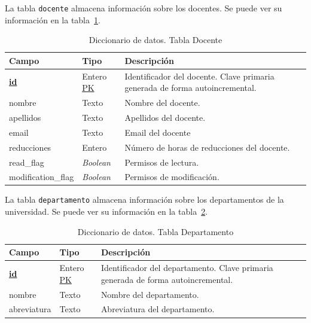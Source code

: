 La tabla \texttt{docente} almacena información sobre los docentes. Se puede ver su información en la tabla~\ref{tab:diccionario_docente}.

\begin{table}
  \centering 
  \begin{tabular}{l p{} p{}}
    \toprule
    \textbf{Campo} & \textbf{Tipo} & \textbf{Descripción}\\
    \midrule
    \textbf{\underline{id}} & Entero \underline{PK} & Identificador del docente. Clave primaria generada de forma autoincremental. \\ \addlinespace
    nombre & Texto & Nombre del docente. \\ \addlinespace
    apellidos & Texto & Apellidos del docente. \\ \addlinespace
    email & Texto & Email del docente \\ \addlinespace
    reducciones & Entero & Número de horas de reducciones del docente. \\ \addlinespace
    read\_flag & \textit{Boolean} & Permisos de lectura. \\ \addlinespace
    modification\_flag & \textit{Boolean} & Permisos de modificación. \\
    \bottomrule
  \end{tabular}
  \caption{Diccionario de datos. Tabla Docente}
  \label{tab:diccionario_docente}
\end{table}

La tabla \texttt{departamento} almacena información sobre los departamentos de la universidad. 
Se puede ver su información en la tabla~\ref{tab:diccionario_departamento}.

\begin{table}
  \centering 
  \begin{tabular}{l p{} p{}}
    \toprule
    \textbf{Campo} & \textbf{Tipo} & \textbf{Descripción}\\
    \midrule
    \textbf{\underline{id}} & Entero \underline{PK} & Identificador del departamento. Clave primaria generada de forma autoincremental. \\ \addlinespace
    nombre & Texto & Nombre del departamento. \\ \addlinespace
    abreviatura & Texto & Abreviatura del departamento. \\
    \bottomrule
  \end{tabular}
  \caption{Diccionario de datos. Tabla Departamento}
  \label{tab:diccionario_departamento}
\end{table}

